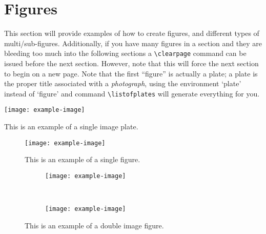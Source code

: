   \section{Figures}
  This section will provide examples of how to create figures, and different types of multi/sub-figures. 
  Additionally, if you have many figures in a section and they are bleeding too much into the following sections a \texttt{\textbackslash{}clearpage} command can be issued before the next section. 
  However, note that this will force the next section to begin on a new page. 
  Note that the first ``figure'' is actually a plate; a plate is the proper title associated with a \textit{photograph}, using the environment `plate' instead of `figure' and command \texttt{\textbackslash{listofplates}} will generate everything for you.
  \begin{plate}[H]
    \centering
    \texttt{[image: example-image]}
    \caption{This is an example of a single image plate.}
    \label{plate:singleImage}
  \end{plate}
  
  \begin{figure}[H]
    \centering
    \texttt{[image: example-image]}
    \caption{This is an example of a single figure.}
    \label{fig:singleImage}
  \end{figure}
  
  \begin{figure}[H]
    \centering
    \begin{subfigure}{0.45\textwidth}
      \texttt{[image: example-image]}
      \caption{} %
      \label{fig:doubleImage:a}
    \end{subfigure}
    ~
    \begin{subfigure}{0.45\textwidth}
      \texttt{[image: example-image]}
      \caption{} %
      \label{fig:doubleImage:b}
    \end{subfigure}
    \caption{This is an example of a double image figure.}
    \label{fig:doubleImage}
  \end{figure}
  
